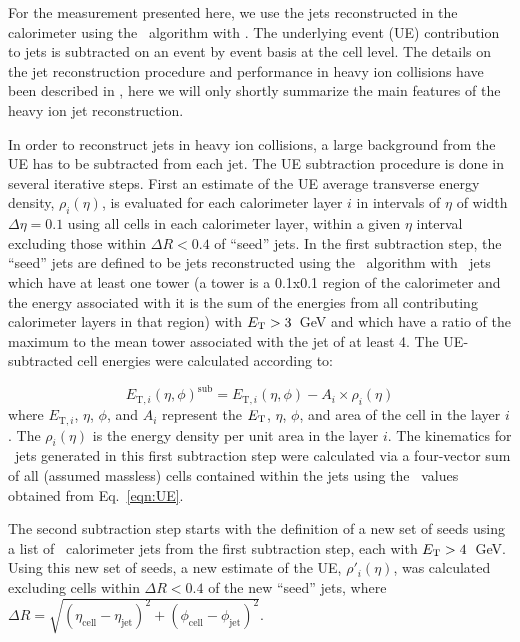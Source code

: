 
\label{Sec:JetRec}
For the measurement presented here, we use the jets reconstructed in the calorimeter 
using the \antikt\ algorithm \cite{Cacciari:2008gp} with \RFour.
The underlying event (UE) contribution to jets is subtracted on 
an event by event basis at the cell level. The details on the jet reconstruction 
procedure and performance in heavy ion collisions have been described in 
\cite{ATLAS-COM-PHYS-2011-1733}, here we will only shortly summarize the main 
features of the heavy ion jet reconstruction.

In order to reconstruct jets in heavy ion collisions, a large background from 
the UE has to be subtracted from each jet. 
The UE subtraction procedure is done in several iterative steps. 
First an estimate of the UE average transverse energy density, $\rho_i(\eta)$, 
is evaluated for each calorimeter layer $i$ in intervals of $\eta$ of width 
$\Delta \eta = 0.1$ using all cells in each calorimeter layer, within a given 
$\eta$ interval excluding those within $\Delta R < 0.4$ of ``seed'' jets. In the first 
subtraction step, the ``seed'' jets are defined to be jets reconstructed using the 
\antikt\ algorithm with \RTwo\ jets which have at 
least one tower  (a tower is a 0.1x0.1 region of the calorimeter and the energy
associated with it is the sum of the energies from all contributing calorimeter layers
in that region)
with $\mbox{$E_{\mathrm{T}}$} > 3$~GeV and which have a ratio of the maximum to 
the mean tower associated with the jet of at least 4. 
  The UE-subtracted cell energies  were calculated according to:

\begin{equation}
\label{eqn:UE}
E_{\mathrm{T},i}(\eta, \phi)^{\mathrm{sub}} = E_{\mathrm{T},i}(\eta, \phi) - A_i \times \rho_i(\eta) 
\end{equation}
where $E_{\mathrm{T},i}$, $\eta$, $\phi$,  and $A_i$ represent the $\mbox{$E_{\mathrm{T}}$}$, $\eta$, 
$\phi$, and area of the cell in the layer $i$. The $\rho_i(\eta)$ is the energy density per unit area in the layer $i$. The kinematics for \RTwo\ jets 
generated in this first subtraction step were calculated via a four-vector sum 
of all (assumed massless) cells contained within the jets using the \Et\ values 
obtained from Eq.~\ref{eqn:UE}.

The second subtraction step starts with the definition of a new set of 
seeds using a list of \RTwo\ calorimeter jets from the first 
subtraction step, each with $\mbox{$E_{\mathrm{T}}$} > 4$~GeV. Using this new set of 
seeds, a new estimate of the UE, $\rho'_i(\eta)$, was calculated excluding 
cells within $\Delta R < 0.4$ of the new ``seed'' jets, where $\Delta R = \sqrt{ 
(\eta_{\mathrm{cell}} - \eta_{\mathrm{jet}})^2 + (\phi_{\mathrm{cell}} - \phi_{\mathrm{jet}})^2}$.


